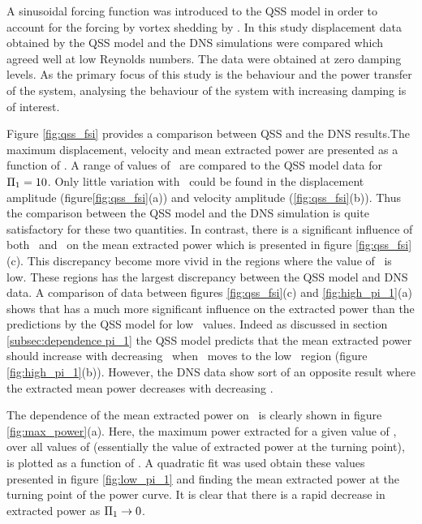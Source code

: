 
A sinusoidal forcing function was introduced to the QSS model in order to account for the forcing by vortex shedding by \citet{Joly2012}. In this study displacement data obtained by the QSS model and the DNS simulations were compared which agreed well at low Reynolds numbers. The data were obtained at zero damping levels. As the primary focus of this study is the behaviour and the power transfer of the system, analysing the behaviour of the system with increasing damping is of interest.   

Figure \ref{fig:qss_fsi} provides a comparison between QSS and the DNS results.The maximum displacement, velocity and mean extracted power are presented as a function of \massdamp. A range of values of \massstiff\ are compared to the QSS model data for $\Pi_1 = 10$. Only little variation with \massstiff \ could be found in  the displacement amplitude (figure\ref{fig:qss_fsi}(a)) and velocity amplitude (\ref{fig:qss_fsi}(b)). Thus the comparison between the QSS model and the DNS simulation is quite satisfactory for these two quantities. In contrast, there is a significant influence of both \massstiff\ and \massdamp\ on the mean extracted power which is  presented in figure \ref{fig:qss_fsi}(c). This discrepancy become more vivid in the regions where the value of \massstiff\ is low. These regions has the largest discrepancy between the QSS model and DNS data. A comparison of data between figures \ref{fig:qss_fsi}(c) and \ref{fig:high_pi_1}(a) shows that \massstiff has a much more significant influence on the extracted power than the predictions by the QSS model for low \massstiff\ values. Indeed as discussed in section \ref{subsec:dependence pi_1} the QSS model predicts that the mean extracted power should increase with decreasing \massstiff\ when \massstiff\ moves to the low \massstiff\ region (figure \ref{fig:high_pi_1}(b)). However, the DNS data show sort of an opposite result where the extracted mean power decreases with decreasing \massstiff.






The dependence of the mean extracted power on \massstiff\ is clearly shown in figure \ref{fig:max_power}(a).  Here, the maximum power extracted for a given value of \massstiff, over all values of \massdamp (essentially the value of extracted power at the turning point), is plotted as a function of \massstiff. A quadratic fit was used obtain these values presented in figure \ref{fig:low_pi_1} and finding the mean extracted power at the turning point of the power curve. It is clear that there is a rapid decrease in extracted power as $\Pi_1 \rightarrow 0$. 

